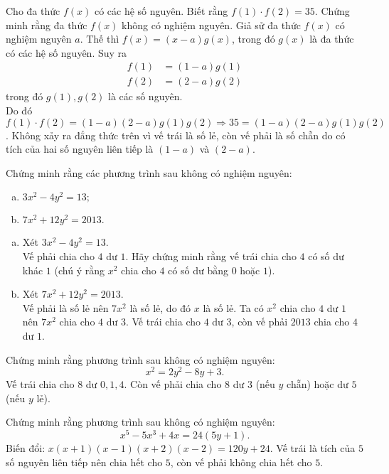 \begin{bt}
	Cho đa thức $f(x)$ có các hệ số nguyên. Biết rằng $f(1) \cdot f(2) = 35$. Chứng minh rằng đa thức $f(x)$ không có nghiệm nguyên.
	\loigiai 
	{
		Giả sử đa thức $f(x)$ có nghiệm nguyên $a$. Thế thì $f(x)=(x-a)g(x)$, trong đó $g(x)$ là đa thức có các hệ số nguyên. Suy ra
		\begin{align*}
			f(1)&=(1-a)g(1) \\
			f(2)&=(2-a)g(2)
		\end{align*}
		trong đó $g(1), g(2)$ là các số nguyên. \\
		Do đó $f(1) \cdot f(2) = (1-a)(2-a)g(1)g(2) \Rightarrow 35=(1-a)(2-a)g(1)g(2)$. Không xảy ra đẳng thức trên vì vế trái là số lẻ, còn vế phải là số chẵn do có tích của hai số nguyên liên tiếp là $(1-a)$ và $(2-a)$.
	}
\end{bt}

\begin{bt}
	Chứng minh rằng các phương trình sau không có nghiệm nguyên:
	\begin{multicols}{2}
		\begin{enumerate}[a)]
			\item $3x^2-4y^2=13;$
			\item $7x^2+12y^2=2013.$
		\end{enumerate}
	\end{multicols}
	\loigiai 
	{
		\begin{enumerate}[a)]
			\item Xét $3x^2-4y^2=13$. \\
			Vế phải chia cho $4$ dư $1$. Hãy chứng minh rằng vế trái chia cho $4$ có số dư khác $1$ (chú ý rằng $x^2$ chia cho $4$ có số dư bằng $0$ hoặc $1$).
			\item Xét $7x^2+12y^2=2013$. \\
			Vế phải là số lẻ nên $7x^2$ là số lẻ, do đó $x$ là số lẻ. Ta có $x^2$ chia cho $4$ dư $1$ nên $7x^2$ chia cho $4$ dư $3$. Vế trái chia cho $4$ dư $3$, còn vế phải $2013$ chia cho $4$ dư $1$.
		\end{enumerate}
	}
\end{bt}

\begin{bt}
	Chứng minh rằng phương trình sau không có nghiệm nguyên: $$x^2=2y^2-8y+3.$$
	\loigiai 
	{
		Vế trái chia cho $8$ dư $0,1,4$. Còn vế phải chia cho $8$ dư $3$ (nếu $y$ chẵn) hoặc dư $5$ (nếu $y$ lẻ).
	}
\end{bt}

\begin{bt}
	Chứng minh rằng phương trình sau không có nghiệm nguyên: $$x^5-5x^3+4x=24(5y+1).$$
	\loigiai 
	{
		Biến đổi: $x(x+1)(x-1)(x+2)(x-2)=120y+24$. Vế trái là tích của $5$ số nguyên liên tiếp nên chia hết cho $5$, còn vế phải không chia hết cho $5$.
	}
\end{bt}

